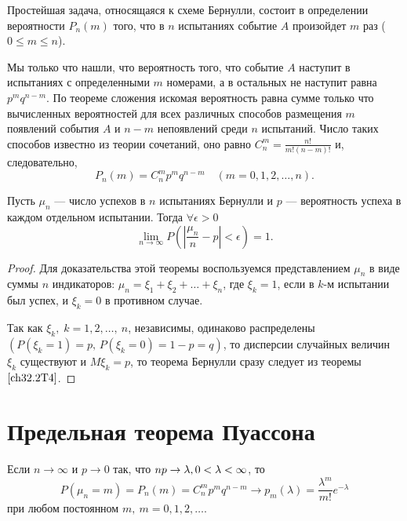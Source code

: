 Простейшая задача, относящаяся к схеме Бернулли, состоит в определении вероятности $P_n(m)$ того, что в $n$ испытаниях событие $A$ произойдет $m$ раз ($0 \le m \le n$).

Мы только что нашли, что вероятность того, что событие $A$ наступит в испытаниях с определенными $m$ номерами, а в остальных не наступит равна $p^mq^{n - m}$. По теореме сложения искомая вероятность равна сумме только что вычисленных вероятностей для всех различных способов размещения $m$ появлений события $A$ и $n - m$ непоявлений среди $n$ испытаний. Число таких способов известно из теории сочетаний, оно равно 	$C_n^m = \frac{n!}{m!(n - m)!}$ и, следовательно,
\begin{equation} \label{ch32.1.1eq1}
P_n(m) = C_n^m p^mq^{n - m} \quad (m = 0,1,2,\ldots,n).
\end{equation}

\begin{thm} [Бернулли]
Пусть $\mu_n$ --- число успехов в $n$ испытаниях Бернулли и $p$ --- вероятность успеха в каждом отдельном испытании. Тогда $\forall \epsilon > 0$
\begin{equation} \label{ch32.2eq7}
\lim_{n \to \infty} P \left( \left| \frac{\mu_n}{n} - p \right| < \epsilon \right) = 1.
\end{equation}
\end{thm}

\begin{proof}
Для доказательства этой теоремы воспользуемся представлением $\mu_n$ в виде суммы $n$ индикаторов: $\mu_n = \xi_1 + \xi_2 + \ldots + \xi_n$, где $\xi_k = 1$, если в $k$-м испытании был успех, и $\xi_k  = 0$ в противном случае.

Так как $\xi_k,\; k = 1,2,\ldots, \: n$, независимы, одинаково распределены $(P( \xi_k = 1) = p, \,P( \xi_k = 0) = 1 - p = q)$, то дисперсии случайных величин $\xi_k$ существуют и $M  \xi_k = p$, то теорема Бернулли сразу следует из теоремы $\ref{ch32.2T4}$.
\end{proof}

\section{Предельная теорема Пуассона}
\begin{thm} [Пуассона]
Если $n \to \infty$ и $p \to 0$ так, что $np \to \lambda, \:\\ 0 < \lambda < \infty$, то
$$
P(\mu_n = m) = P_n(m) = C_n^m p^mq^{n - m} \to p_m(\lambda) = \frac{\lambda^m}{m!} e^{-\lambda}
$$
при любом постоянном $m, \: m = 0,1,2,\dots$.
\end{thm}

